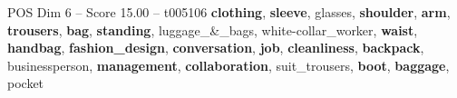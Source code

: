 \begin{textsample}{POS Dim 6 – Score 15.00 – t005106}  \label{ex:f6_pos_023}
\textbf{clothing}, \textbf{sleeve}, glasses, \textbf{shoulder}, \textbf{arm}, \textbf{trousers}, \textbf{bag}, \textbf{standing}, luggage\_\&\_bags, white-collar\_worker, \textbf{waist}, \textbf{handbag}, \textbf{fashion\_design}, \textbf{conversation}, \textbf{job}, \textbf{cleanliness}, \textbf{backpack}, businessperson, \textbf{management}, \textbf{collaboration}, suit\_trousers, \textbf{boot}, \textbf{baggage}, pocket

\end{textsample}
